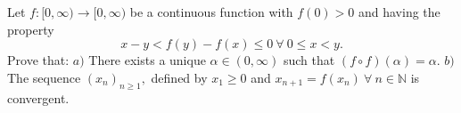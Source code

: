 Let $f: [0, \infty) \to [0, \infty)$ be a continuous function with $f(0)>0$ and having the property $$x-y<f(y)-f(x) \le 0~\forall~0 \le x<y.$$Prove that:
$a)$ There exists a unique $\alpha \in (0, \infty)$ such that $(f \circ f)(\alpha)=\alpha.$
$b)$ The sequence $(x_n)_{n \ge 1},$ defined by $x_1 \ge 0$ and $x_{n+1}=f(x_n)~\forall~n \in \mathbb{N}$ is convergent.